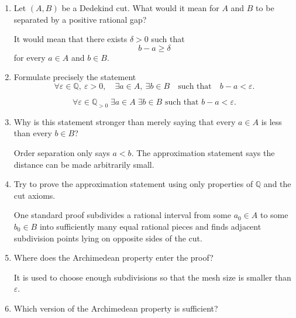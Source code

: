 \documentclass{essay}
\begin{document}
\begin{enumerate}[label=\arabic*., itemsep=10pt]

\item Let $(A,B)$ be a Dedekind cut.
What would it mean for $A$ and $B$ to be separated by a positive rational gap?

\begin{answer}
It would mean that there exists $\delta>0$ such that
\[
b-a\ge\delta
\]
for every $a\in A$ and $b\in B$.
\end{answer}

\item Formulate precisely the statement
\[
\forall\varepsilon\in\mathbb{Q},\ \varepsilon>0,
\quad
\exists a\in A,\ \exists b\in B
\quad\text{such that}\quad
b-a<\varepsilon.
\]

\begin{answer}
\[
\forall\varepsilon\in\mathbb{Q}_{>0}\;
\exists a\in A\;\exists b\in B
\text{ such that }b-a<\varepsilon.
\]
\end{answer}

\item Why is this statement stronger than merely saying that every $a\in A$ is less than every $b\in B$?

\begin{answer}
Order separation only says $a<b$. The approximation statement says the distance can be made arbitrarily small.
\end{answer}

\item Try to prove the approximation statement using only properties of $\mathbb{Q}$ and the cut axioms.

\begin{answer}
One standard proof subdivides a rational interval from some $a_0\in A$ to some $b_0\in B$ into sufficiently many equal rational pieces and finds adjacent subdivision points lying on opposite sides of the cut.
\end{answer}

\item Where does the Archimedean property enter the proof?

\begin{answer}
It is used to choose enough subdivisions so that the mesh size is smaller than $\varepsilon$.
\end{answer}

\item Which version of the Archimedean property is sufficient?


\end{enumerate}
\end{document}
